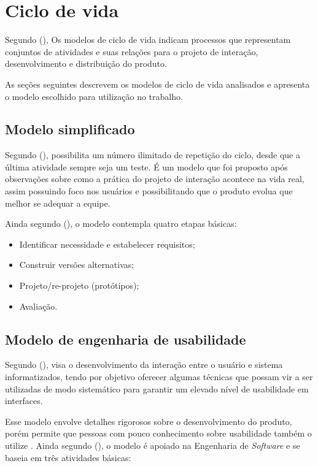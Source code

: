 \chapter{Ciclo de vida}
  Segundo \citeauthor{ihc} (\citeyear{ihc}), Os modelos de ciclo de vida indicam processos que representam conjuntos
  de atividades e suas relações para o projeto de interação, desenvolvimento e distribuição do produto.
  
  As seções seguintes descrevem os modelos de ciclo de vida analisados e apresenta o modelo escolhido para utilização no trabalho.
  \section{Modelo simplificado}
  
  Segundo \citeauthor{ihc} (\citeyear{ihc}), possibilita um número ilimitado de repetição do ciclo, desde que a última 
  atividade sempre seja um teste. É um modelo que foi proposto após observações sobre como a prática do projeto de interação
  acontece na vida real, assim possuindo foco nos usuários e possibilitando que o produto evolua que melhor se adequar a equipe.
  
  Ainda segundo \citeauthor{ihc} (\citeyear{ihc}), o modelo contempla quatro etapas básicas:
  
  \begin{itemize}
  \item Identificar necessidade e estabelecer requisitos;
  \item Construir versões alternativas;
  \item Projeto/re-projeto (protótipos);
  \item Avaliação.
  \end{itemize}  
  
  
  \section{Modelo de engenharia de usabilidade}
  
  Segundo \citeauthor{engusabilidade} (\citeyear{engusabilidade}), visa o desenvolvimento da interação entre o usuário e
  sistema informatizados, tendo por objetivo oferecer algumas técnicas 
  que possam vir a ser utilizadas de modo sistemático para garantir um elevado nível de usabilidade em interfaces. 
  
  
  Esse modelo envolve detalhes rigorosos sobre o desenvolvimento do produto, porém permite que pessoas com pouco 
  conhecimento sobre usabilidade também o utilize \cite{ihc}. 
  Ainda segundo \citeauthor{ihc} (\citeyear{ihc}), o modelo é apoiado na Engenharia de \textit{Software} e se baseia
  em três atividades básicas:
  
